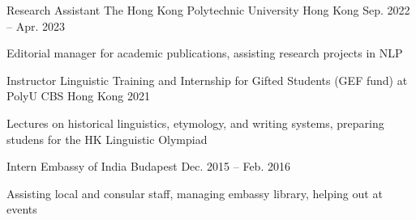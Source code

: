 
\begin{cventries}

  \cventry
    {Research Assistant} %
    {The Hong Kong Polytechnic University} %
    {Hong Kong} %
    {Sep. 2022 -- Apr. 2023} %
    {
      \begin{cvitems} %
        \item {Editorial manager for academic publications, assisting research projects in NLP}
      \end{cvitems}
    }

  \cventry
    {Instructor} %
    {Linguistic Training and Internship for Gifted Students (GEF fund) at PolyU CBS} %
    {Hong Kong} %
    {2021} %
    {
      \begin{cvitems} %
        \item {Lectures on historical linguistics, etymology, and writing systems, preparing studens for the HK Linguistic Olympiad}
      \end{cvitems}
    }

  \cventry
    {Intern} %
    {Embassy of India} %
    {Budapest} %
    {Dec. 2015 -- Feb. 2016} %
    {
      \begin{cvitems} %
        \item {Assisting local and consular staff, managing embassy library, helping out at events}
      \end{cvitems}
    }

\end{cventries}
